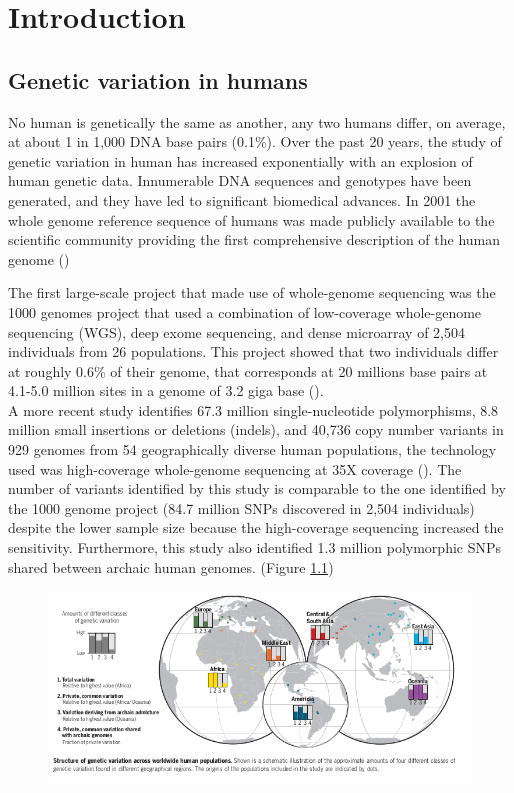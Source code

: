 \chapter{Introduction}
\label{Chapter1}

\section {Genetic variation in humans }

No human is genetically the same as another, any two humans differ, on average, at about 1 in 1,000 DNA base pairs (0.1\%).
Over the past 20 years, the study of genetic variation in human has increased exponentially with an explosion of human genetic data. 
Innumerable DNA sequences and genotypes have been generated, and they have led to significant biomedical advances. 
In 2001 the whole genome reference sequence of humans was made publicly available to the scientific community  providing the first comprehensive description of the human genome (\cite{lander2001initial})

The first large-scale project that made use of whole-genome sequencing was the 1000 genomes project that used a combination of low-coverage whole-genome sequencing (WGS), deep exome sequencing, and dense microarray of 2,504 individuals from 26 populations. 
This project showed that two individuals differ at roughly  0.6\% of their genome, that corresponds at 20 millions base pairs at 4.1-5.0 million sites in a genome of 3.2 giga base (\cite{1000genome2015global}). \\

A more recent study identifies 67.3 million single-nucleotide polymorphisms, 8.8 million small insertions or deletions (indels), and 40,736 copy number variants in 929 genomes from 54 geographically diverse human populations, the technology used was high-coverage whole-genome sequencing at 35X coverage (\cite{bergstrom2020insights}). 
The number of variants identified by this study is comparable to the one identified by the 1000 genome project (84.7 million SNPs discovered in 2,504 individuals) despite the lower sample size because the high-coverage sequencing increased the sensitivity. Furthermore, this study also identified 1.3 million polymorphic SNPs shared between archaic human genomes. (Figure \ref{fig:HGDP}) \\

\begin{figure}[H]
\centering
\includegraphics[width=1\textwidth]{Fig/HGDP.png}
\decoRule
\caption{}
\label{fig:HGDP}
\end{figure}

